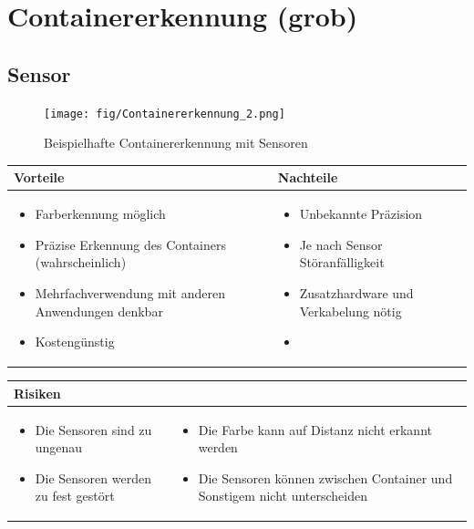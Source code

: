 
\section{Containererkennung (grob)}


\subsection{Sensor}

\begin{figure} [hbp]
	\centering
	\texttt{[image: fig/Containererkennung\_2.png]}
	\caption{Beispielhafte Containererkennung mit Sensoren}
\end{figure}

\begin{table}[h]
\begin{tabular}{p{} | p{}}


 \textbf{Vorteile} & \textbf{Nachteile} \\ \hline
	 
\begin{itemize}
\item Farberkennung möglich
\item Präzise Erkennung des Containers (wahrscheinlich)
\item Mehrfachverwendung mit anderen Anwendungen denkbar
\item Kostengünstig
\end{itemize}

 
 &
 
\begin{itemize}
\item Unbekannte Präzision
\item Je nach Sensor Störanfälligkeit
\item Zusatzhardware und Verkabelung nötig
\item 
\end{itemize}

\end{tabular}
\end{table}

\begin{table}[h]
\begin{tabular}{p{}p{}}


 \textbf{Risiken} & \\ \hline
	 
\begin{itemize}
\item Die Sensoren sind zu ungenau
\item Die Sensoren werden zu fest gestört
\end{itemize}
&
\begin{itemize}
\item Die Farbe kann auf Distanz nicht erkannt werden
\item Die Sensoren können zwischen Container und Sonstigem nicht unterscheiden
\end{itemize}

 
\end{tabular}
\end{table}

